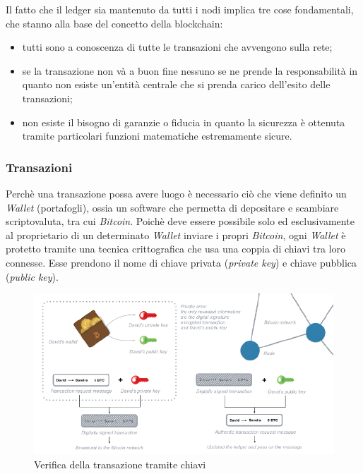 \documentclass[11pt]{thesistemp}
\begin{document}
Il fatto che il ledger sia mantenuto da tutti i nodi implica tre cose fondamentali, che stanno alla base del concetto della blockchain:
\begin{itemize}
\item  tutti sono a conoscenza di tutte le transazioni che avvengono sulla rete;
\item se la transazione non và a buon fine nessuno se ne prende la responsabilità in quanto non esiste un’entità centrale che si prenda carico dell’esito delle transazioni;
\item non esiste il bisogno di garanzie o fiducia in quanto la sicurezza è ottenuta tramite particolari funzioni matematiche estremamente sicure.
\end{itemize} 
\pagebreak

\subsubsection{Transazioni}
Perchè una transazione possa avere luogo è necessario ciò che viene definito un \textit{Wallet} (portafogli), ossia un software che permetta di depositare e scambiare scriptovaluta, tra cui \textit{Bitcoin}.
Poichè deve essere possibile solo ed esclusivamente al proprietario di un determinato \textit{Wallet} inviare i propri \textit{Bitcoin}, ogni \textit{Wallet} è protetto tramite una tecnica crittografica che usa una coppia di chiavi tra loro connesse.
Esse prendono il nome di chiave privata (\textit{private key}) e chiave pubblica (\textit{public key}).
\begin{figure}[h]\hfill
    \centering
    \includegraphics[width=\textwidth]{public-private-keys.png}
    \caption{Verifica della transazione tramite chiavi}
    \label{fig:pkey}
\end{figure}\\
\end{document}
